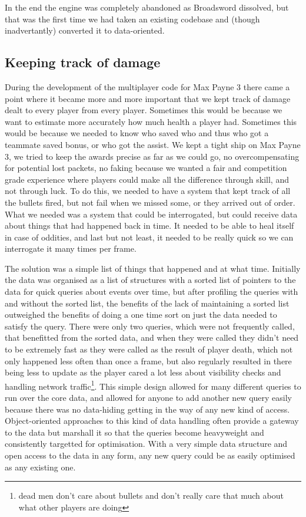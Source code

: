 In the end the engine was completely abandoned as Broadsword dissolved, but
that was the first time we had taken an existing codebase and (though
inadvertantly) converted it to data-oriented.

\subsection{Keeping track of damage}

During the development of the multiplayer code for Max Payne 3 there came a
point where it became more and more important that we kept track of damage
dealt to every player from every player. Sometimes this would be because we
want to estimate more accurately how much health a player had. Sometimes this
would be because we needed to know who saved who and thus who got a teammate
saved bonus, or who got the assist. We kept a tight ship on Max Payne 3, we
tried to keep the awards precise as far as we could go, no overcompensating for
potential lost packets, no faking because we wanted a fair and competition
grade experience where players could make all the difference through skill, and
not through luck. To do this, we needed to have a system that kept track of all
the bullets fired, but not fail when we missed some, or they arrived out of
order. What we needed was a system that could be interrogated, but could
receive data about things that had happened back in time. It needed to be able
to heal itself in case of oddities, and last but not least, it needed to be
really quick so we can interrogate it many times per frame.

The solution was a simple list of things that happened and at what time.
Initially the data was organised as a list of structures with a sorted list of
pointers to the data for quick queries about events over time, but after
profiling the queries with and without the sorted list, the benefits of the
lack of maintaining a sorted list outweighed the benefits of doing a one time
sort on just the data needed to satisfy the query. There were only two queries,
which were not frequently called, that benefitted from the sorted data, and
when they were called they didn't need to be extremely fast as they were called
as the result of player death, which not only happened less often than once a
frame, but also regularly resulted in there being less to update as the player
cared a lot less about visibility checks and handling network
traffic\footnote{dead men don't care about bullets and don't really care that
much about what other players are doing}. This simple design allowed for many
different queries to run over the core data, and allowed for anyone to add
another new query easily because there was no data-hiding getting in the way of
any new kind of access. Object-oriented approaches to this kind of data
handling often provide a gateway to the data but marshall it so that the
queries become heavyweight and consistently targetted for optimisation. With a
very simple data structure and open access to the data in any form, any new
query could be as easily optimised as any existing one.

